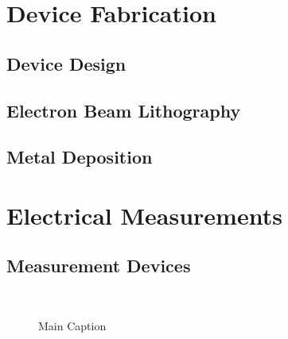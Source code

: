 \section{Device Fabrication}\label{sec:device_fabrication}
\subsection{Device Design}\label{subsec:device_design}
\subsection{Electron Beam Lithography}\label{subsec:lithography}
\subsection{Metal Deposition}\label{subsec:deposition}


\section{Electrical Measurements}\label{sec:measurements}
\subsection{Measurement Devices}\label{subsec:measurement_devices}
\begin{figure}[ht]
	\centering
	~
	\caption[Measurement setup]{Main Caption}
	\label{fig:measurement}
\end{figure}
	

